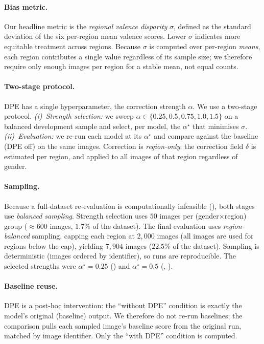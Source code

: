 \paragraph{Bias metric.}
Our headline metric is the \emph{regional valence disparity} $\sigma$, defined
as the standard deviation of the six per-region mean valence scores. Lower
$\sigma$ indicates more equitable treatment across regions. Because $\sigma$ is
computed over per-region \emph{means}, each region contributes a single value
regardless of its sample size; we therefore require only enough images per
region for a stable mean, not equal counts.

\paragraph{Two-stage protocol.}
DPE has a single hyperparameter, the correction strength $\alpha$. We use a
two-stage protocol. \emph{(i)~Strength selection:} we sweep
$\alpha\in\{0.25,0.5,0.75,1.0,1.5\}$ on a balanced development sample and select,
per model, the $\alpha^{\star}$ that minimises $\sigma$. \emph{(ii)~Evaluation:}
we re-run each model at its $\alpha^{\star}$ and compare against the baseline
(DPE off) on the same images. Correction is \emph{region-only}: the correction
field $\delta$ is estimated per region, and applied to all images of that region
regardless of gender.

\paragraph{Sampling.}
Because a full-dataset re-evaluation is computationally infeasible
(), both stages use \emph{balanced sampling}. Strength
selection uses $50$ images per (gender$\times$region) group ($\approx600$ images,
$1.7\%$ of the dataset). The final evaluation uses \emph{region-balanced}
sampling, capping each region at $2{,}000$ images (all images are used for
regions below the cap), yielding $7{,}904$ images ($22.5\%$ of the dataset).
Sampling is deterministic (images ordered by identifier), so runs are
reproducible. The selected strengths were
$\alpha^{\star}{=}0.25$ () and $\alpha^{\star}{=}0.5$
(, ).

\paragraph{Baseline reuse.}
DPE is a post-hoc intervention: the ``without DPE'' condition is exactly the
model's original (baseline) output. We therefore do not re-run baselines; the
comparison pulls each sampled image's baseline score from the original run,
matched by image identifier. Only the ``with DPE'' condition is computed.


